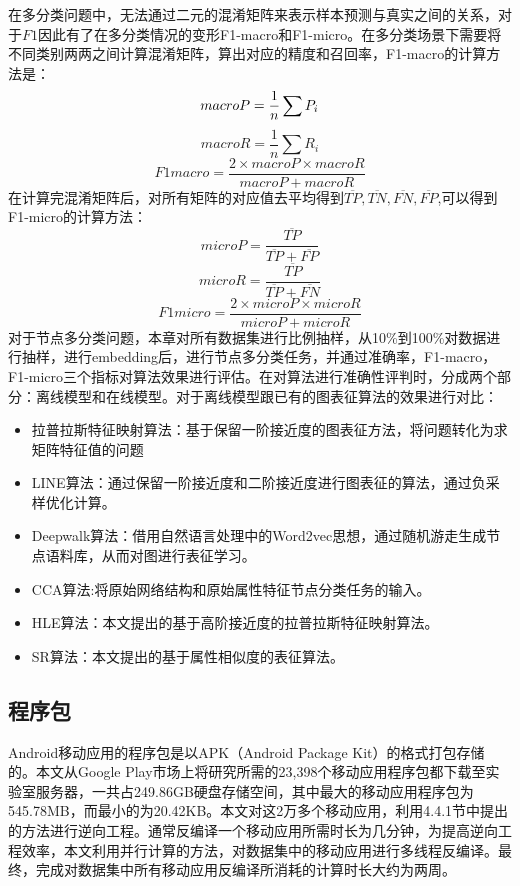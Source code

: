 在多分类问题中，无法通过二元的混淆矩阵来表示样本预测与真实之间的关系，对于$F1$因此有了在多分类情况的变形F1-macro和F1-micro。在多分类场景下需要将不同类别两两之间计算混淆矩阵，算出对应的精度和召回率，F1-macro的计算方法是：
\begin{equation}
	macro\-P = \frac{1}{n}\sum P_i
\end{equation}
\begin{equation}
macroR = \frac{1}{n}\sum R_i
\end{equation}
\begin{equation}
F1macro = \frac{2\times macroP\times macroR}{macroP+macroR}
\end{equation}
在计算完混淆矩阵后，对所有矩阵的对应值去平均得到$\overline{TP}, \overline{TN}, \overline{FN},\overline{FP}$,可以得到F1-micro的计算方法：
\begin{equation}
microP = \frac{\overline{TP}}{\overline{TP}+\overline{FP}}
\end{equation}
\begin{equation}
microR = \frac{\overline{TP}}{\overline{TP}+\overline{FN}}
\end{equation}
\begin{equation}
F1micro = \frac{2\times microP\times microR}{microP+microR}
\end{equation}
对于节点多分类问题，本章对所有数据集进行比例抽样，从10\%到100\%对数据进行抽样，进行embedding后，进行节点多分类任务，并通过准确率，F1-macro，F1-micro三个指标对算法效果进行评估。在对算法进行准确性评判时，分成两个部分：离线模型和在线模型。对于离线模型跟已有的图表征算法的效果进行对比：
\begin{itemize}
	\item 拉普拉斯特征映射算法：基于保留一阶接近度的图表征方法，将问题转化为求矩阵特征值的问题
	\item LINE算法：通过保留一阶接近度和二阶接近度进行图表征的算法，通过负采样优化计算。
	\item Deepwalk算法：借用自然语言处理中的Word2vec思想，通过随机游走生成节点语料库，从而对图进行表征学习。
	\item CCA算法\cite{hardoon2004canonical}:将原始网络结构和原始属性特征节点分类任务的输入。
	\item HLE算法：本文提出的基于高阶接近度的拉普拉斯特征映射算法。
	\item SR算法：本文提出的基于属性相似度的表征算法。
	
\end{itemize}

\subsection{程序包}
Android移动应用的程序包是以\textsf{APK}（Android Package Kit）的格式打包存储的。本文从Google Play市场上将研究所需的23,398个移动应用程序包都下载至实验室服务器，一共占249.86GB硬盘存储空间，其中最大的移动应用程序包为545.78MB，而最小的为20.42KB。本文对这2万多个移动应用，利用4.4.1节中提出的方法进行逆向工程。通常反编译一个移动应用所需时长为几分钟，为提高逆向工程效率，本文利用并行计算的方法，对数据集中的移动应用进行多线程反编译。最终，完成对数据集中所有移动应用反编译所消耗的计算时长大约为两周。

